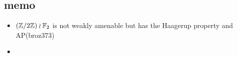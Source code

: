 \subsection{memo}
\begin{itemize}
\item $(\mathbb{Z}/2\mathbb{Z})\wr\mathbb{F}_2$ is not weakly amenable but has the Haagerup property and AP(broz373)
  \item 
\end{itemize}
